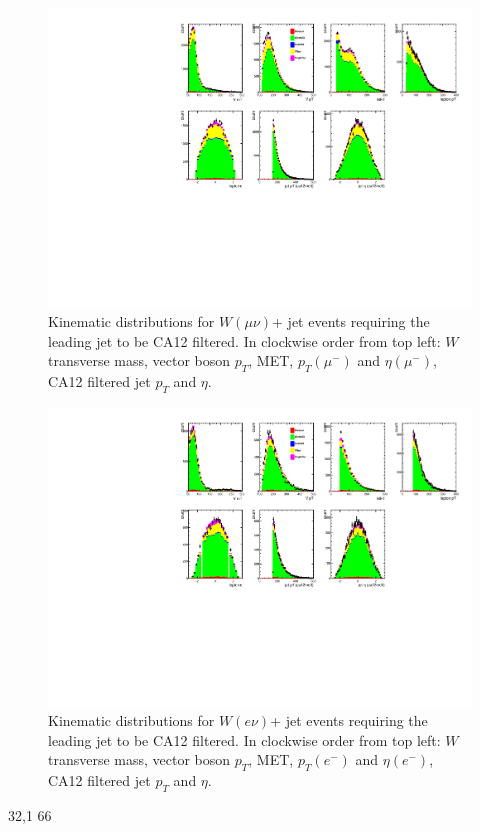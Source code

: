 \begin{figure}[htb]
\centering
\includegraphics[width=1.0\textwidth]{figs/kinematics_stack_ca12_Wmunu.pdf}
\caption{Kinematic distributions for $W(\mu\nu)$+ jet events requiring the leading jet to be CA12 filtered. In clockwise order from top left: $W$ transverse mass, vector boson $p_T$, MET, $p_T (\mu^-)$ and $\eta (\mu^-)$, CA12 filtered jet $p_T$ and $\eta$.}
\label{figs:kin3_CA12}
\end{figure}

\begin{figure}[htb]
\centering
\includegraphics[width=1.0\textwidth]{figs/kinematics_stack_ca12_Wenu.pdf}
\caption{Kinematic distributions for $W(e\nu)$+ jet events requiring the leading jet to be CA12 filtered. In clockwise order from top left: $W$ transverse mass, vector boson $p_T$, MET, $p_T (e^-)$ and $\eta (e^-)$, CA12 filtered jet $p_T$ and $\eta$.}
\label{figs:kin4_CA12}
\end{figure}
                                                                                                          32,1          66%



